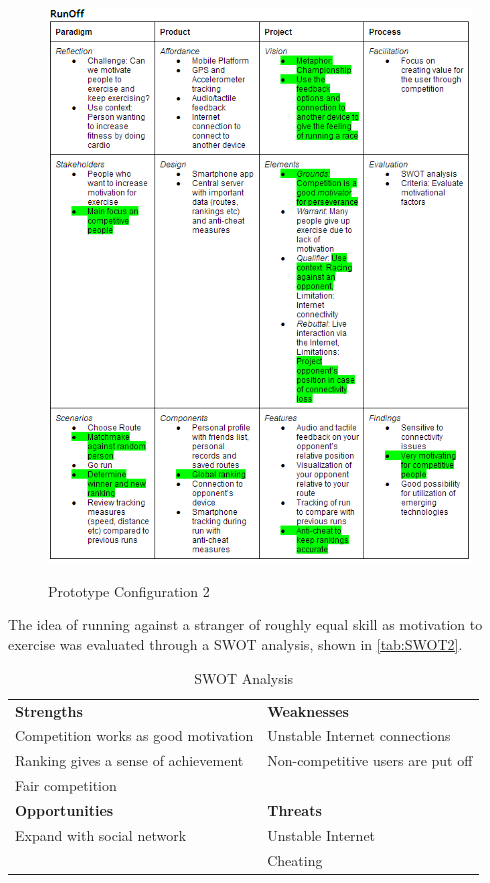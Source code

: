 \begin{figure}[ht!]
\begin{center}
 \label{fig:prototypeconfig2}
 \includegraphics[width=\textwidth]{img/prototypeconfig2.png}
 \caption{Prototype Configuration 2}
\end{center}
\end{figure}

The idea of running against a stranger of roughly equal skill as motivation to exercise was evaluated through a \ac{SWOT} analysis, shown in \autoref{tab:SWOT2}.

\begin{table}[!ht]
	\begin{tabular}{| l | l |}
		\hline
		\textbf{Strengths} & \textbf{Weaknesses} \\ 
		Competition works as good motivation & Unstable Internet connections \\ 
		Ranking gives a sense of achievement & Non-competitive users are put off \\
		Fair competition & \\ \hline
		\textbf{Opportunities} & \textbf{Threats} \\ 
		Expand with social network & Unstable Internet \\
		& Cheating \\
		\hline
	\end{tabular}
	\caption{SWOT Analysis}
	\label{tab:SWOT2}
\end{table}

